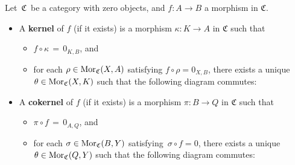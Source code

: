 
\vskip 0.5cm
\begin{definition}
\mbox{}
\vskip 0.15cm
\noindent
Let \,$\mathfrak{C}$\, be a category with zero objects, and $f : A \longrightarrow B$ a morphism in $\mathfrak{C}$.
\begin{itemize}
\item
	A \textbf{kernel} of $f$ (if it exists) is a morphism $\kappa : K \longrightarrow A$ in $\mathfrak{C}$ such that
	\begin{itemize}
	\item
		\vskip -0.15cm
		$f \circ \kappa \,=\, 0_{K,B}$, and
	\item
		for each $\rho \in \textnormal{Mor}_{\mathfrak{C}}(X,A)$ satisfying $f \circ \rho = 0_{X,B}$,
		there exists a unique $\theta \in \textnormal{Mor}_{\mathfrak{C}}(X,K)$ such that the following diagram commutes:
		\begin{center}
		\end{center}
	\end{itemize}
\item
	A \textbf{cokernel} of $f$ (if it exists) is a morphism $\pi : B \longrightarrow Q$ in $\mathfrak{C}$ such that
	\begin{itemize}
	\item
		\vskip -0.15cm
		$\pi \circ f \,=\, 0_{A,Q}$, and
	\item
		for each $\sigma \in \textnormal{Mor}_{\mathfrak{C}}(B,Y)$ satisfying \,$\sigma \circ f = 0$,
		there exists a unique $\theta \in \textnormal{Mor}_{\mathfrak{C}}(Q,Y)$ such that the following diagram commutes:
		\begin{center}
		\end{center}
	\end{itemize}
\end{itemize}
\end{definition}

